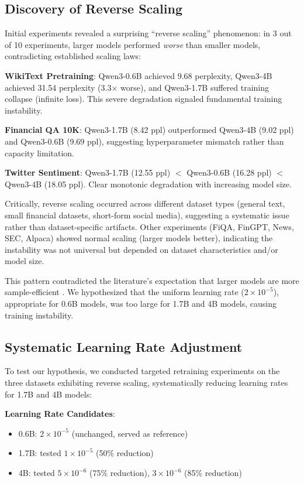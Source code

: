 \subsection{Discovery of Reverse Scaling}

Initial experiments revealed a surprising ``reverse scaling'' phenomenon: in 3 out of 10 experiments, larger models performed \textit{worse} than smaller models, contradicting established scaling laws:

\textbf{WikiText Pretraining}: Qwen3-0.6B achieved 9.68 perplexity, Qwen3-4B achieved 31.54 perplexity (3.3$\times$ worse), and Qwen3-1.7B suffered training collapse (infinite loss). This severe degradation signaled fundamental training instability.

\textbf{Financial QA 10K}: Qwen3-1.7B (8.42 ppl) outperformed Qwen3-4B (9.02 ppl) and Qwen3-0.6B (9.69 ppl), suggesting hyperparameter mismatch rather than capacity limitation.

\textbf{Twitter Sentiment}: Qwen3-1.7B (12.55 ppl) $<$ Qwen3-0.6B (16.28 ppl) $<$ Qwen3-4B (18.05 ppl). Clear monotonic degradation with increasing model size.

Critically, reverse scaling occurred across different dataset types (general text, small financial datasets, short-form social media), suggesting a systematic issue rather than dataset-specific artifacts. Other experiments (FiQA, FinGPT, News, SEC, Alpaca) showed normal scaling (larger models better), indicating the instability was not universal but depended on dataset characteristics and/or model size.

This pattern contradicted the literature's expectation that larger models are more sample-efficient \parencite{kaplan2020scaling}. We hypothesized that the uniform learning rate ($2 \times 10^{-5}$), appropriate for 0.6B models, was too large for 1.7B and 4B models, causing training instability.

\subsection{Systematic Learning Rate Adjustment}

To test our hypothesis, we conducted targeted retraining experiments on the three datasets exhibiting reverse scaling, systematically reducing learning rates for 1.7B and 4B models:

\textbf{Learning Rate Candidates}:
\begin{itemize}
\item 0.6B: $2 \times 10^{-5}$ (unchanged, served as reference)
\item 1.7B: tested $1 \times 10^{-5}$ (50\% reduction)
\item 4B: tested $5 \times 10^{-6}$ (75\% reduction), $3 \times 10^{-6}$ (85\% reduction)
\end{itemize}


